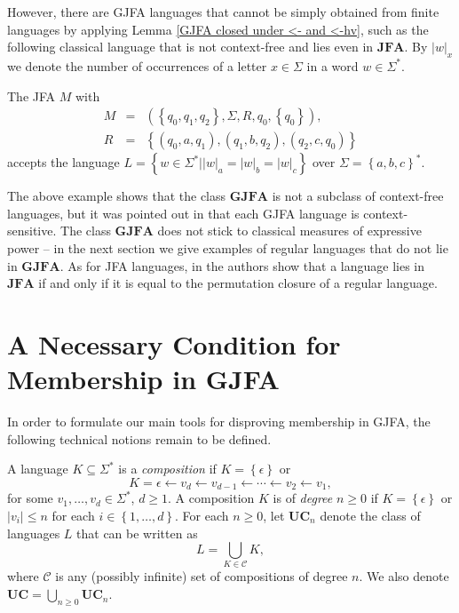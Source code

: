 \documentclass{ws-ijmpc}
\begin{document}
However, there are GJFA languages that cannot be simply obtained from
finite languages by applying Lemma \ref{GJFA closed under <- and <-hv},
such as the following classical language that is not context-free
and lies even in $\mathbf{JFA}$. By $\left|w\right|_{x}$ we denote
the number of occurrences of a letter $x\in\Sigma$ in a word $w\in\Sigma^{*}$.
\begin{example}
The JFA $M$ with
\begin{eqnarray*}
M & = & \left(\left\{ q_{0},q_{1},q_{2}\right\} ,\Sigma,R,q_{0},\left\{ q_{0}\right\} \right),\\
R & = & \left\{ \left(q_{0},a,q_{1}\right),\left(q_{1},b,q_{2}\right),\left(q_{2},c,q_{0}\right)\right\} 
\end{eqnarray*}
accepts the language $L=\left\{ w\in\Sigma^{*}|\left|w\right|_{a}=\left|w\right|_{b}=\left|w\right|_{c}\right\} $
over $\Sigma=\left\{ a,b,c\right\} ^{*}$.
\end{example}
The above example shows that the class $\mathbf{GJFA}$ is not a subclass
of context-free languages, but it was pointed out in \citep{athMED1}
that each GJFA language is context-sensitive. The class $\mathbf{GJFA}$
does not stick to classical measures of expressive power -- in the
next section we give examples of regular languages that do not lie
in $\mathbf{GJFA}$. As for JFA languages, in \citep{athMED1book}
the authors show that a language lies in $\mathbf{JFA}$ if and only
if it is equal to the permutation closure of a regular language.


\section{A Necessary Condition for Membership in GJFA}

In order to formulate our main tools for disproving membership in
GJFA, the following technical notions remain to be defined.
\begin{definition}
A language $K\subseteq\Sigma^{*}$ is a \emph{composition }if $K=\left\{ \epsilon\right\} $
or 
\[
K=\epsilon\leftarrow v_{d}\leftarrow v_{d-1}\leftarrow\cdots\leftarrow v_{2}\leftarrow v_{1},
\]
for some $v_{1},\dots,v_{d}\in\Sigma^{*}$, $d\ge1$. A composition
$K$ is of \emph{degree} $n\ge0$ if $K=\left\{ \epsilon\right\} $
or$\left|v_{i}\right|\le n$ for each $i\in\left\{ 1,\dots,d\right\} $.
For each $n\ge0$, let $\mathbf{UC}_{n}$ denote the class of languages
$L$ that can be written as 
\[
L=\bigcup_{K\in\mathcal{C}}K,
\]
where $\mathcal{C}$ is any (possibly infinite) set of compositions
of degree $n$. We also denote $\mathbf{UC}=\bigcup_{n\ge0}\mathbf{UC}_{n}$.
\end{definition}
\end{document}
